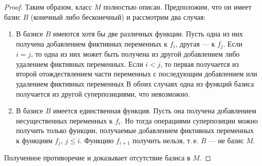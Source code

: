 \begin{proof}
    Таким образом, класс $M$ полностью описан. Предположим, что он имеет базис $B$ (конечный либо бесконечный) и рассмотрим два случая:
    \begin{enumerate}
        \item В базисе $B$ имеются хотя бы две различных функции. Пусть одна из них получена добавлением фиктивных переменных к $f_i$, другая --- к $f_j$. Если $i = j$, то одна из них может быть получена из другой добавлением либо удалением фиктивных переменных. Если $i < j$, то первая получается из второй отождествлением части переменных с последующим добавлением или удалением фиктивных переменных В обоих случаях одна из функций базиса получается из другой суперпозициями, что невозможно.
        \item В базисе $B$ имеется единственная функция. Пусть она получена добавлением несущественных переменных к $f_i$. Но тогда операциями суперпозиции можно получить только функции, получаемые добавлением фиктивных переменных к функциям $f_j$, $j \leqslant i$. Функцию $f_{i + 1}$ получить нельзя, т.\,е. $B$ --- не базис $M$.
    \end{enumerate}

    Полученное противоречие и доказывает отсутствие базиса в $M$.
\end{proof}

